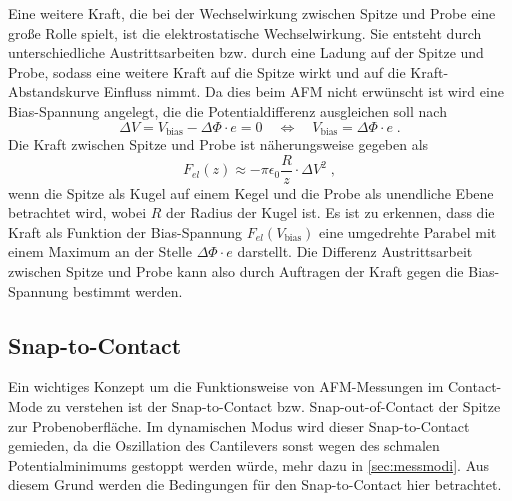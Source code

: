     Eine weitere Kraft, die bei der Wechselwirkung zwischen Spitze und Probe eine große Rolle spielt, ist die elektrostatische Wechselwirkung.
    Sie entsteht durch unterschiedliche Austrittsarbeiten bzw. durch eine Ladung auf der Spitze und Probe, sodass eine weitere Kraft auf die Spitze wirkt und auf die Kraft-Abstandskurve Einfluss nimmt.
    Da dies beim AFM nicht erwünscht ist wird eine Bias-Spannung angelegt, die die Potentialdifferenz ausgleichen soll nach 
    \begin{equation}
        \Delta V = V_{\mathrm{bias}} - \Delta \Phi \cdot e = 0 \quad \Leftrightarrow \quad V_{\mathrm{bias}} = \Delta \Phi \cdot e \;.
    \end{equation}
    Die Kraft zwischen Spitze und Probe ist näherungsweise gegeben als
    \begin{equation}
        F_{el}(z) \approx -\pi \epsilon_0 \frac{R}{z} \cdot \Delta V^2 \;,
    \end{equation}
    wenn die Spitze als Kugel auf einem Kegel und die Probe als unendliche Ebene betrachtet wird, wobei $R$ der Radius der Kugel ist.
    Es ist zu erkennen, dass die Kraft als Funktion der Bias-Spannung $F_{el}(V_{\mathrm{bias}})$ eine umgedrehte Parabel mit einem Maximum an der Stelle $\Delta \Phi \cdot e$ darstellt.
    Die Differenz Austrittsarbeit zwischen Spitze und Probe kann also durch Auftragen der Kraft gegen die Bias-Spannung bestimmt werden.

\subsection{Snap-to-Contact}
    Ein wichtiges Konzept um die Funktionsweise von AFM-Messungen im Contact-Mode zu verstehen ist der Snap-to-Contact bzw. Snap-out-of-Contact der Spitze zur Probenoberfläche.
    Im dynamischen Modus wird dieser Snap-to-Contact gemieden, da die Oszillation des Cantilevers sonst wegen des schmalen Potentialminimums gestoppt werden würde, mehr dazu in \autoref{sec:messmodi}.
    Aus diesem Grund werden die Bedingungen für den Snap-to-Contact hier betrachtet.

